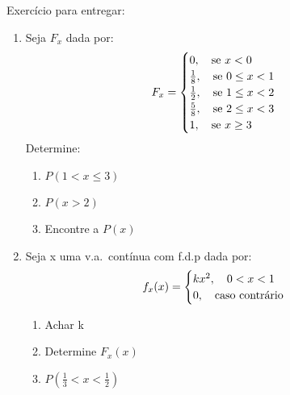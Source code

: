 \documentclass[11pt,a4paper]{article}
\begin{document}
Exercício para entregar: 
\begin{enumerate}
  \item  Seja $F_{x}$ dada por:
    \begin{align*}
      F_{x}=\begin{cases} 
        0, \text{\quad se }x<0 \\
        \frac{1}{8},\text{\quad se }0 \le x <1 \\
        \frac{1}{2}, \text{\quad se }1 \le x < 2 \\
        \frac{5}{8}, \text{\quad se }2 \le x < 3 \\
        1,\text{\quad se } x \geq 3
      \end{cases}
    \end{align*}
    Determine: 
    \begin{enumerate}[label=(\alph*)]
      \item $P(1 < x \le 3)$
      \item $P(x>2)$
      \item Encontre a $P(x)$
    \end{enumerate}
  \item  Seja x uma v.a.\ contínua com f.d.p dada por: 
    \begin{align*}
      f_{x}(x)= 
      \begin{cases}
        kx^2,\text{\quad} 0<x<1\\
        0, \text{\quad caso contrário}
      \end{cases}
    \end{align*}
    \begin{enumerate}[label=(\alph*)]
      \item Achar k
      \item Determine $F_{x}(x)$
      \item $P(\frac{1}{3} < x < \frac{1}{2})$
    \end{enumerate}

\end{enumerate}
\end{document}
